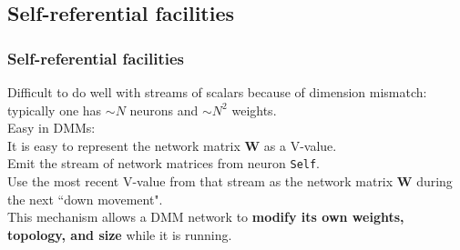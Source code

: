 \documentclass{beamer}
\newcommand{\msmagenta}[1]{{\color{mymagenta} #1}}
\begin{document}
\subsection{Self-referential facilities}

\begin{frame}

  \frametitle{\msmagenta{Self-referential facilities}}

Difficult to do well with streams of scalars because of dimension mismatch:
typically one has $\sim N$ neurons and $\sim N^2$ weights.\\[2ex]

\msmagenta{Easy in DMMs:}\\[2ex]

It is easy to represent the network matrix {\bf W} as a V-value.\\[2ex]

Emit the stream
of network matrices from neuron {\tt Self}.\\[2ex]

Use the most recent V-value from that stream
as the network matrix {\bf W} during the
next ``down movement".\\[2ex]

This mechanism allows a DMM network to 
{\bf modify its own weights, topology, and size}
while it is running.

\end{frame}
\end{document}
